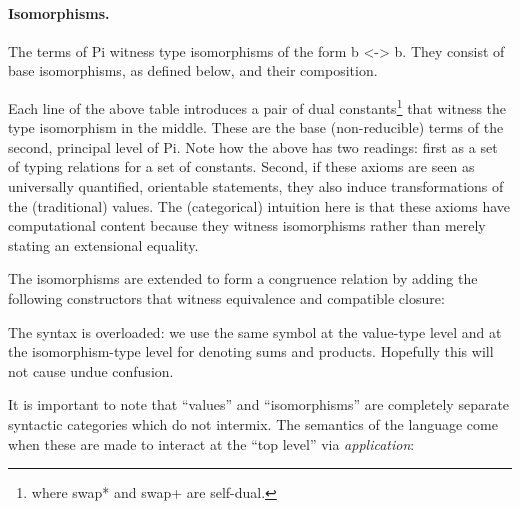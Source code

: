 \documentclass[preprint]{sigplanconf}
\begin{document}
\paragraph*{Isomorphisms.} The terms of {{Pi}} witness
type isomorphisms of the form {{b <-> b}}. They consist of base
isomorphisms, as defined below, and their composition.

\noindent Each line of the above table introduces a pair of dual
constants\footnote{where {{swap*}} and {{swap+}} are self-dual.} that witness
the type isomorphism in the middle.  These are the base (non-reducible) terms
of the second, principal level of {{Pi}}. Note how the above has two
readings: first as a set of typing relations for a set of constants. Second,
if these axioms are seen as universally quantified, orientable statements,
they also induce transformations of the (traditional) values. The
(categorical) intuition here is that these axioms have computational content
because they witness isomorphisms rather than merely stating an extensional
equality.

The isomorphisms are extended to form a congruence relation by adding the
following constructors that witness equivalence and compatible closure:

%
%
%
\noindent The syntax is overloaded: we use the same symbol at the value-type level
and at the isomorphism-type level for denoting sums and products.  Hopefully
this will not cause undue confusion.

It is important to note that ``values'' and ``isomorphisms'' are completely
separate syntactic categories which do not intermix. The semantics of the
language come when these are made to interact at the ``top level'' via
\emph{application}: 
\end{document}
